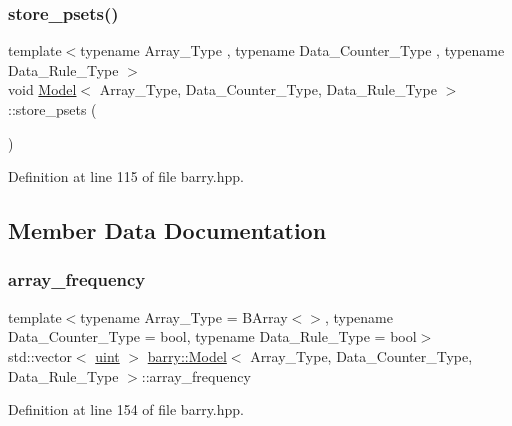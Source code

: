 \mbox{\label{classbarry_1_1_model_a06a6f52dfc6868908cf11e6663a93904}} 
\subsubsection{\texorpdfstring{store\+\_\+psets()}{store\_psets()}}
{\footnotesize\ttfamily template$<$typename Array\+\_\+\+Type , typename Data\+\_\+\+Counter\+\_\+\+Type , typename Data\+\_\+\+Rule\+\_\+\+Type $>$ \\
void \hyperlink{classbarry_1_1_model}{Model}$<$ Array\+\_\+\+Type, Data\+\_\+\+Counter\+\_\+\+Type, Data\+\_\+\+Rule\+\_\+\+Type $>$\+::store\+\_\+psets (\begin{DoxyParamCaption}{ }\end{DoxyParamCaption})\hspace{0.3cm}{\ttfamily [inline]}}



Definition at line 115 of file barry.\+hpp.



\subsection{Member Data Documentation}
\mbox{\label{classbarry_1_1_model_a64041df6ecac9aface20f9d13c0b22eb}} 
\subsubsection{\texorpdfstring{array\+\_\+frequency}{array\_frequency}}
{\footnotesize\ttfamily template$<$typename Array\+\_\+\+Type  = B\+Array$<$$>$, typename Data\+\_\+\+Counter\+\_\+\+Type  = bool, typename Data\+\_\+\+Rule\+\_\+\+Type  = bool$>$ \\
std\+::vector$<$ \hyperlink{namespacebarry_a11dfc53ddb4672278319aa04f1e09a6c}{uint} $>$ \hyperlink{classbarry_1_1_model}{barry\+::\+Model}$<$ Array\+\_\+\+Type, Data\+\_\+\+Counter\+\_\+\+Type, Data\+\_\+\+Rule\+\_\+\+Type $>$\+::array\+\_\+frequency}



Definition at line 154 of file barry.\+hpp.

